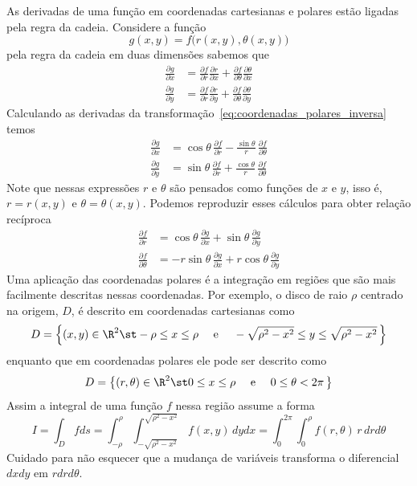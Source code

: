 As derivadas de uma função em coordenadas cartesianas e polares
estão ligadas pela regra da cadeia. Considere a função
\[
  g(x, y) = f\big( r(x, y), \theta(x, y) \big)
\]
pela regra da cadeia em duas dimensões sabemos que
\begin{align*}
  \frac{\partial g}{\partial x}
  & = \frac{\partial f}{\partial r     } \frac{\partial r     }{\partial x}
    + \frac{\partial f}{\partial \theta} \frac{\partial \theta}{\partial x} \\[5mm]
  \frac{\partial g}{\partial y}
  & = \frac{\partial f}{\partial r     } \frac{\partial r     }{\partial y}
    + \frac{\partial f}{\partial \theta} \frac{\partial \theta}{\partial y}
\end{align*}
Calculando as derivadas da transformação~\eqref{eq:coordenadas_polares_inversa} temos
\begin{equation}
\label{eq:coordenadas_polares_regra_cadeia}
\begin{split}
  \frac{\partial g}{\partial x}
  & = \cos\theta           \,\frac{\partial f}{\partial r     }
    - \frac{\sin\theta}{r} \,\frac{\partial f}{\partial \theta}
     \\[5mm]
  \frac{\partial g}{\partial y}
  & =  \sin\theta           \,\frac{\partial f}{\partial r     }
    +  \frac{\cos\theta}{r} \,\frac{\partial f}{\partial \theta}
\end{split}
\end{equation}
Note que nessas expressões $r$ e $\theta$ são pensados como funções de
$x$ e $y$, isso é, $r=r(x, y)$ e $\theta = \theta(x, y)$.
Podemos reproduzir esses cálculos para obter relação recíproca
\begin{equation}
  \label{eq:coordenadas_polares_regra_cadeia_reciproca}
  \begin{split}
    \frac{\partial f}{\partial r}
    & = \cos\theta \,\frac{\partial g}{\partial x}
      + \sin\theta \,\frac{\partial g}{\partial y}
    \\[5mm]
    \frac{\partial f}{\partial \theta}
    & =
      - r \sin\theta \,\frac{\partial g}{\partial x}
      + r \cos\theta \,\frac{\partial g}{\partial y}
  \end{split}
\end{equation}
Uma aplicação das coordenadas polares é a integração em regiões que são mais
facilmente descritas nessas coordenadas. Por exemplo, o disco de raio $\rho$
centrado na origem, $D$, é descrito em coordenadas cartesianas como
\[
  D = \left\{
        (x, y) \in\R^2 \st
        -\rho \leq x \leq \rho
        \quad\text{ e }\quad
        -\sqrt{ \rho^2 -x^2} \leq y \leq \sqrt{ \rho^2 - x^2}\,
  \right\}
\]
enquanto que em coordenadas polares ele pode ser descrito como
\[
  D = \left\{
  (r, \theta) \in\R^2 \st
    0 \leq x \leq \rho
    \quad\text{ e }\quad
    0 \leq \theta < 2\pi \,
  \right\}
\]
Assim a integral de uma função $f$ nessa região assume a forma
\[
  I = \int_D f ds
    = \int_{-\rho}^{\rho} \int_{-\sqrt{ \rho^2 -x^2}}^{\sqrt{ \rho^2 -x^2}} \, f(x, y) \, dy dx
    = \int_0^{2\pi} \int_0^\rho  f(r, \theta) \,r\, dr d\theta
\]
Cuidado para não esquecer que a mudança de variáveis transforma o diferencial
$dxdy$ em $rdrd\theta$.


